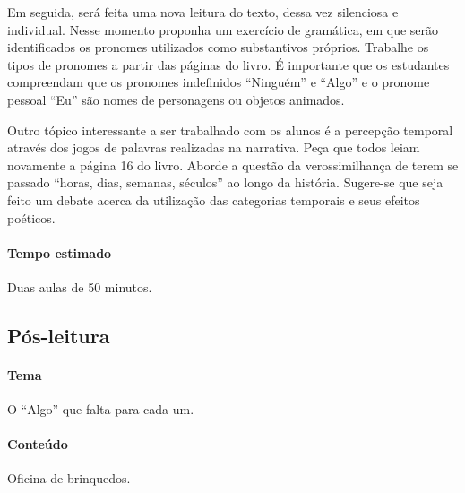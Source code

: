 \documentclass[11pt]{extarticle}
\begin{document}
Em seguida, será feita uma nova leitura do texto, dessa vez silenciosa e individual. Nesse momento proponha um exercício de gramática, em que serão identificados os pronomes utilizados como substantivos próprios. Trabalhe os tipos de pronomes a partir das páginas do livro. É importante que os estudantes compreendam que os pronomes indefinidos ``Ninguém'' e ``Algo'' e o pronome pessoal ``Eu'' são nomes de personagens ou objetos animados. 



Outro tópico interessante a ser trabalhado com os alunos é a percepção temporal através dos jogos de palavras realizadas na narrativa. Peça que todos leiam novamente a página 16 do livro. Aborde a questão da verossimilhança de terem se passado ``horas, dias, semanas, séculos'' ao longo da história. Sugere-se que seja feito um debate acerca da utilização das categorias temporais e seus efeitos poéticos.


\paragraph{Tempo estimado} Duas aulas de 50 minutos.

\subsection{Pós-leitura}


\paragraph{Tema} O ``Algo'' que falta para cada um.

\paragraph{Conteúdo} Oficina de brinquedos.
\end{document}
